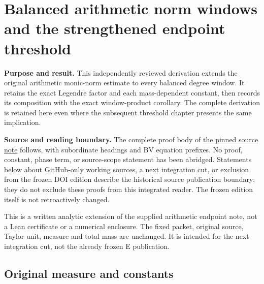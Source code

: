 \section{Balanced arithmetic norm windows and the strengthened endpoint threshold}\label{balanced-window-balanced-arithmetic-norm-windows-and-the-strengthened-endpoint-threshold}

\textbf{Purpose and result.}
This independently reviewed derivation extends the original arithmetic monic-norm estimate to every balanced degree window. It retains the exact Legendre factor and each mass-dependent constant, then records its composition with the exact window-product corollary. The complete derivation is retained here even where the subsequent threshold chapter presents the same implication.

\textbf{Source and reading boundary.}
The complete proof body of \href{https://github.com/KokunoYumeto/zeta-function-research-reader/blob/952ef9fee1e1419b6858d920354de8fa99430b7d/workbenches/tau-arithmetic-endpoint-bounds/BALANCED_WINDOW_PROOF.md}{the pinned source note} follows, with subordinate headings and BV equation prefixes. No proof, constant, phase term, or source-scope statement has been abridged. Statements below about GitHub-only working sources, a next integration cut, or exclusion from the frozen DOI edition describe the historical source publication boundary; they do not exclude these proofs from this integrated reader. The frozen edition itself is not retroactively changed.

\begingroup
\setlength{\emergencystretch}{3em}
\providecommand{\tightlist}{\setlength{\itemsep}{0pt}\setlength{\parskip}{0pt}}

This is a written analytic extension of the supplied arithmetic endpoint note, not a Lean certificate or a numerical enclosure. The fixed packet, original source, Taylor unit, measure and total mass are unchanged. It is intended for the next integration cut, not the already frozen E publication.

\subsection[\hspace{0.4em}Original measure and constants]{Original measure and constants}\label{balanced-window-original-measure-and-constants}

